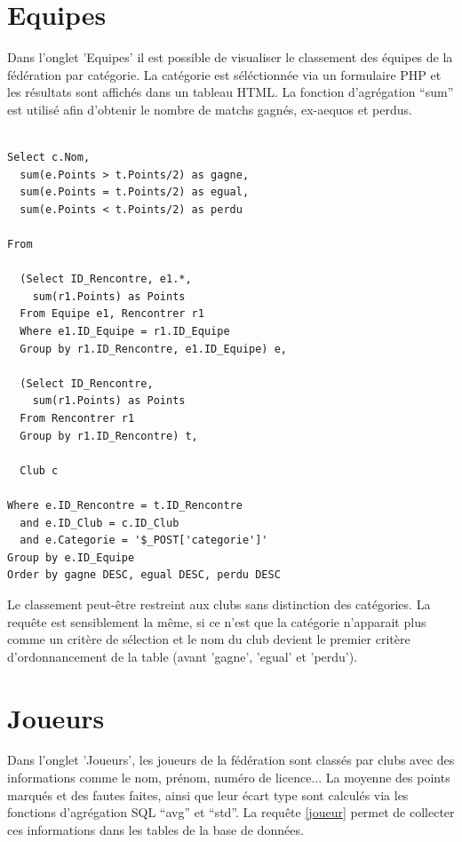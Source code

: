 \documentclass[a4paper»,8pt,french,fleqn]{report}
\begin{document}
\section{Equipes}

Dans l'onglet 'Equipes' il est possible de visualiser le classement des équipes de la fédération par catégorie. La catégorie est séléctionnée via un formulaire PHP et les résultats sont affichés dans un tableau HTML. La fonction d'agrégation ``sum'' est utilisé afin d'obtenir le nombre de matchs gagnés, ex-aequos et perdus. 

\begin{lstlisting}

Select c.Nom,
  sum(e.Points > t.Points/2) as gagne,
  sum(e.Points = t.Points/2) as egual,
  sum(e.Points < t.Points/2) as perdu
  
From
  
  (Select ID_Rencontre, e1.*,
    sum(r1.Points) as Points
  From Equipe e1, Rencontrer r1
  Where e1.ID_Equipe = r1.ID_Equipe
  Group by r1.ID_Rencontre, e1.ID_Equipe) e,

  (Select ID_Rencontre,
    sum(r1.Points) as Points
  From Rencontrer r1
  Group by r1.ID_Rencontre) t,
  
  Club c

Where e.ID_Rencontre = t.ID_Rencontre
  and e.ID_Club = c.ID_Club
  and e.Categorie = '$_POST['categorie']'
Group by e.ID_Equipe
Order by gagne DESC, egual DESC, perdu DESC

\end{lstlisting}

Le classement peut-être restreint aux clubs sans distinction des catégories. La requête est sensiblement la même, si ce n'est que la catégorie n'apparait plus comme un critère de sélection et le nom du club devient le premier critère d'ordonnancement de la table (avant 'gagne', 'egual' et 'perdu'). 


\section{Joueurs}
Dans l'onglet 'Joueurs', les joueurs de la fédération sont classés par clubs avec des informations comme le nom, prénom, numéro de licence... La moyenne des points marqués et des fautes faites, ainsi que leur écart type sont calculés via les fonctions d'agrégation SQL ``avg'' et ``std''. La requête \ref{joueur} permet de collecter ces informations dans les tables de la base de données.
\end{document}
